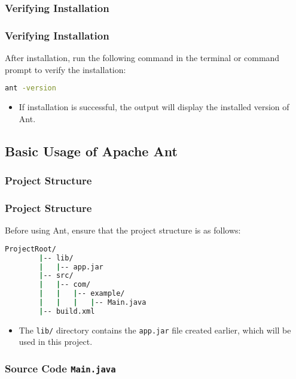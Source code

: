 \documentclass[aspectratio=169, table]{beamer}
\begin{document}
\subsubsection{Verifying Installation}

\begin{frame}[fragile]
	\frametitle{Verifying Installation}
	After installation, run the following command in the terminal or command prompt to verify the installation:
	\begin{lstlisting}[language=bash]
		ant -version
	\end{lstlisting}
	\begin{itemize}
		\item If installation is successful, the output will display the installed version of Ant.
	\end{itemize}
\end{frame}

\subsection{Basic Usage of Apache Ant}

\subsubsection{Project Structure}

\begin{frame}[fragile]
	\frametitle{Project Structure}
	Before using Ant, ensure that the project structure is as follows:
	\begin{lstlisting}[language=bash]
		ProjectRoot/
		|-- lib/
		|   |-- app.jar
		|-- src/
		|   |-- com/
		|   |   |-- example/
		|   |   |   |-- Main.java
		|-- build.xml
	\end{lstlisting}
	\begin{itemize}
		\item The \texttt{lib/} directory contains the \texttt{app.jar} file created earlier, which will be used in this project.
	\end{itemize}
\end{frame}

\subsubsection{Source Code \texttt{Main.java}}
\end{document}
